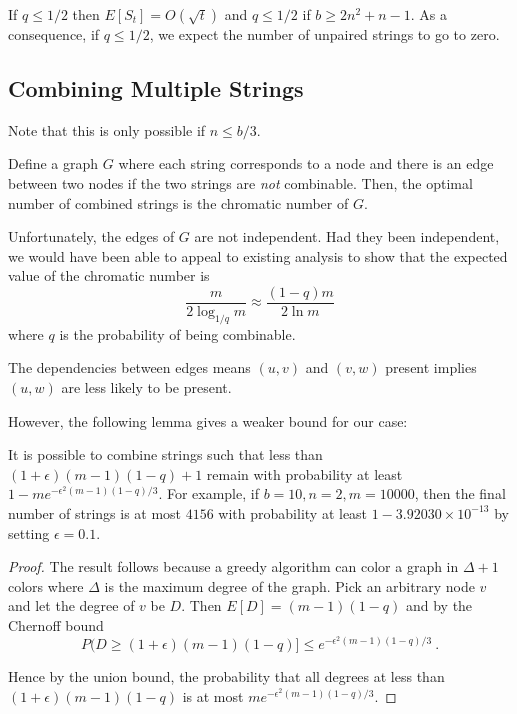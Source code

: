 If $q\leq 1/2$ then $E[S_t]=O(\sqrt{t})$ and $q\leq 1/2$ if $b\geq
2n^2+n-1$. As a consequence, if $q\leq 1/2$,  we expect the number of
unpaired strings to go to zero.

\subsection{Combining Multiple Strings}
Note that this is only possible if $n\leq b/3$.

\begin{lemma}
Define a graph $G$ where each string corresponds to a node and there
is an edge between two nodes if the two strings are \emph{not}
combinable. Then, the optimal number of combined strings is the
chromatic number of $G$.
\end{lemma}

Unfortunately, the edges of $G$ are not independent. Had they been
independent, we would have been able to appeal to existing analysis to
show that the expected value of the chromatic number is
\[
\frac{m}{2\log_{1/q} m}\approx \frac{(1-q)m}{2 \ln m}
\]
where $q$ is the probability of being combinable. 

The dependencies between edges means $(u,v)$ and $(v,w)$ present
implies $(u,w)$ are less likely to be present.

However, the following lemma gives a weaker bound for our case:
\begin{lemma}
It is possible to combine strings such that less than $(1+\epsilon)
(m-1)(1-q)+1$ remain with probability at least $1-me^{-\epsilon^2
  (m-1)(1-q)/3}$. For example, if $b=10, n=2, m=10000$, then the final
number of strings is at most $4156$ with probability at least
$1-3.92030 \times 10^{-13}$ by setting $\epsilon=0.1$.
\end{lemma}

\begin{proof}
The result follows because a greedy algorithm can color a graph in
$\Delta+1$ colors where $\Delta$ is the maximum degree of the graph.
Pick an arbitrary node $v$ and let the degree of $v$ be $D$. Then
$E[D]=(m-1)(1-q)$ and by the Chernoff bound
\[P(D\geq (1+\epsilon) (m-1)(1-q)] \leq e^{-\epsilon^2 (m-1)(1-q)/3}
 \ .\]

Hence by the union bound, the probability that all degrees at less
than $(1+\epsilon) (m-1)(1-q)$ is at most $me^{-\epsilon^2
  (m-1)(1-q)/3}$.

\end{proof}
